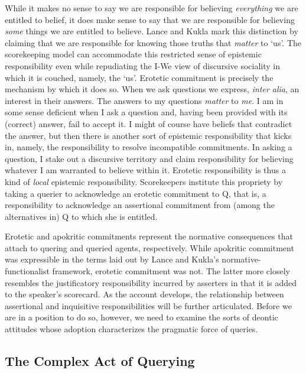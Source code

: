 \documentclass{article}                     %
\begin{document}
While it makes no sense to say we are responsible for believing \emph{everything}
we are entitled to belief, it does make sense to say that we are responsible
for believing \emph{some} things we are entitled to believe. Lance
and Kukla mark this distinction by claiming that we are responsible
for knowing those truths that \emph{matter} to `us'. The scorekeeping
model can accommodate this restricted sense of epistemic responsibility
even while repudiating the I-We view of discursive sociality in which
it is couched, namely, the `us'. Erotetic commitment is precisely
the mechanism by which it does so. When we ask questions we express,
\emph{inter alia}, an interest in their answers. The answers to my
questions \emph{matter} to \emph{me}. I am in some sense deficient
when I ask a question and, having been provided with its (correct)
answer, fail to accept it. I might of course have beliefs that contradict
the answer, but then there is another sort of epistemic responsibility
that kicks in, namely, the responsibility to resolve incompatible
commitments. In asking a question, I stake out a discursive territory
and claim responsibility for believing whatever I am warranted to
believe within it. Erotetic responsibility is thus a kind of \emph{local}
epistemic responsibility. Scorekeepers institute this propriety by
taking a querier to acknowledge an erotetic commitment to Q, that
is, a responsibility to acknowledge an assertional commitment from
(among the alternatives in) Q to which she is entitled.

Erotetic and apokritic commitments represent the normative consequences
that attach to quering and queried agents, respectively. While apokritic
commitment was expressible in the terms laid out by Lance and Kukla's
normative-functionalist framework, erotetic commitment was not. The
latter more closely resembles the justificatory responsibility incurred
by asserters in that it is added to the speaker's scorecard. As the
account develops, the relationship between assertional and inquisitive
responsibilities will be further articulated. Before we are in a position
to do so, however, we need to examine the sorts of deontic attitudes
whose adoption characterizes the pragmatic force of queries.




\subsection{The Complex Act of Querying}
\end{document}
